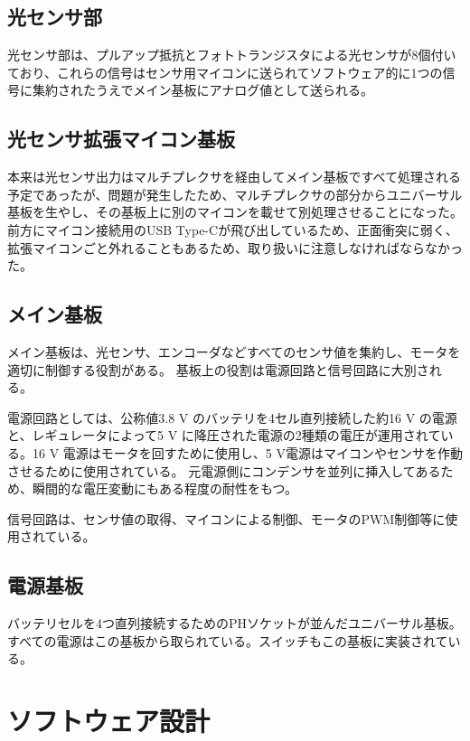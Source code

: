 \documentclass{ltjsreport}
\begin{document}
\section{光センサ部}
光センサ部は、プルアップ抵抗とフォトトランジスタによる光センサが8個付いており、これらの信号はセンサ用マイコンに送られてソフトウェア的に1つの信号に集約されたうえでメイン基板にアナログ値として送られる。


\section{光センサ拡張マイコン基板}
本来は光センサ出力はマルチプレクサを経由してメイン基板ですべて処理される予定であったが、問題が発生したため、マルチプレクサの部分からユニバーサル基板を生やし、その基板上に別のマイコンを載せて別処理させることになった。
前方にマイコン接続用のUSB Type-Cが飛び出しているため、正面衝突に弱く、拡張マイコンごと外れることもあるため、取り扱いに注意しなければならなかった。

\section{メイン基板}
メイン基板は、光センサ、エンコーダなどすべてのセンサ値を集約し、モータを適切に制御する役割がある。
基板上の役割は電源回路と信号回路に大別される。

電源回路としては、公称値3.8 V のバッテリを4セル直列接続した約16 V の電源と、レギュレータによって5 V に降圧された電源の2種類の電圧が運用されている。16 V 電源はモータを回すために使用し、5 V電源はマイコンやセンサを作動させるために使用されている。
元電源側にコンデンサを並列に挿入してあるため、瞬間的な電圧変動にもある程度の耐性をもつ。

信号回路は、センサ値の取得、マイコンによる制御、モータのPWM制御等に使用されている。



\section{電源基板}
バッテリセルを4つ直列接続するためのPHソケットが並んだユニバーサル基板。すべての電源はこの基板から取られている。スイッチもこの基板に実装されている。










\chapter{ソフトウェア設計}\label{cha:software}
\end{document}
